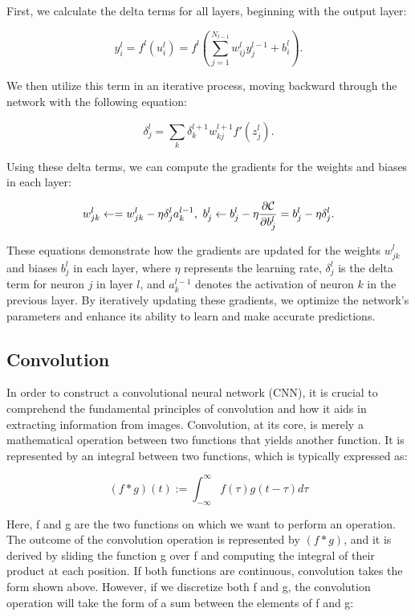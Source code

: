 \documentclass[onecolumn,10pt,cleanfoot]{asme2ej}
\begin{document}
First, we calculate the delta terms for all layers, beginning with the output layer:

\begin{equation}
y_i^l = f^l(u_i^l) = f^l\left(\sum_{j=1}^{N_{l-1}} w_{ij}^l y_j^{l-1} + b_i^l\right).
\end{equation}

We then utilize this term in an iterative process, moving backward through the network with the following equation:

\begin{equation}
\delta_j^l = \sum_k \delta_k^{l+1}w_{kj}^{l+1}f'(z_j^l).
\end{equation}

Using these delta terms, we can compute the gradients for the weights and biases in each layer:

\begin{gather}
w_{jk}^l\leftarrow = w_{jk}^l- \eta \delta_j^la_k^{l-1}, \
b_j^l \leftarrow b_j^l-\eta \frac{\partial {\cal C}}{\partial b_j^l}=b_j^l-\eta \delta_j^l.
\end{gather}

These equations demonstrate how the gradients are updated for the weights $w_{jk}^l$ and biases $b_j^l$ in each layer, where $\eta$ represents the learning rate, $\delta_j^l$ is the delta term for neuron $j$ in layer $l$, and $a_k^{l-1}$ denotes the activation of neuron $k$ in the previous layer. By iteratively updating these gradients, we optimize the network's parameters and enhance its ability to learn and make accurate predictions. 

\subsection{Convolution}
In order to construct a convolutional neural network (CNN), it is crucial to comprehend the fundamental principles of convolution and how it aids in extracting information from images. Convolution, at its core, is merely a mathematical operation between two functions that yields another function. It is represented by an integral between two functions, which is typically expressed as:

\begin{equation}
(f \ast g)(t) := \int_{-\infty}^{\infty} f(\tau) g(t-\tau) d \tau
\end{equation}

Here, f and g are the two functions on which we want to perform an operation. The outcome of the convolution operation is represented by $(f \ast g)$, and it is derived by sliding the function g over f and computing the integral of their product at each position. If both functions are continuous, convolution takes the form shown above. However, if we discretize both f and g, the convolution operation will take the form of a sum between the elements of f and g:
\end{document}
